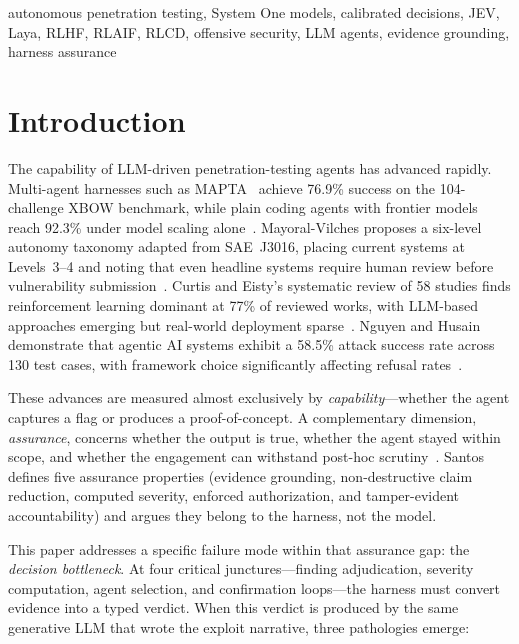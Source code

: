\documentclass[conference]{IEEEtran}
\begin{document}
\begin{IEEEkeywords}
autonomous penetration testing, System One models, calibrated decisions, JEV, Laya, RLHF, RLAIF, RLCD, offensive security, LLM agents, evidence grounding, harness assurance
\end{IEEEkeywords}

\section{Introduction}\label{sec:intro}

The capability of LLM-driven penetration-testing agents has advanced rapidly. Multi-agent harnesses such as MAPTA~\cite{david2025mapta} achieve 76.9\% success on the 104-challenge XBOW benchmark, while plain coding agents with frontier models reach 92.3\% under model scaling alone~\cite{dhakal2026baselines}. Mayoral-Vilches proposes a six-level autonomy taxonomy adapted from SAE~J3016, placing current systems at Levels~3--4 and noting that even headline systems require human review before vulnerability submission~\cite{mayoral2025gap}. Curtis and Eisty's systematic review of 58 studies finds reinforcement learning dominant at 77\% of reviewed works, with LLM-based approaches emerging but real-world deployment sparse~\cite{curtis2025role}. Nguyen and Husain demonstrate that agentic AI systems exhibit a 58.5\% attack success rate across 130 test cases, with framework choice significantly affecting refusal rates~\cite{nguyen2025agenticpentest}.

These advances are measured almost exclusively by \emph{capability}---whether the agent captures a flag or produces a proof-of-concept. A complementary dimension, \emph{assurance}, concerns whether the output is true, whether the agent stayed within scope, and whether the engagement can withstand post-hoc scrutiny~\cite{santos2026assurance}. Santos defines five assurance properties (evidence grounding, non-destructive claim reduction, computed severity, enforced authorization, and tamper-evident accountability) and argues they belong to the harness, not the model.

This paper addresses a specific failure mode within that assurance gap: the \emph{decision bottleneck}. At four critical junctures---finding adjudication, severity computation, agent selection, and confirmation loops---the harness must convert evidence into a typed verdict. When this verdict is produced by the same generative LLM that wrote the exploit narrative, three pathologies emerge:
\end{document}
